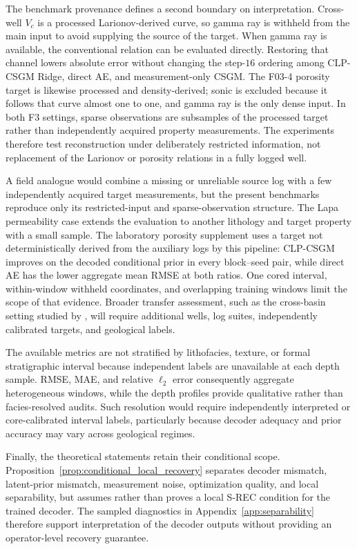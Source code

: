 The benchmark provenance defines a second boundary on interpretation.
Cross-well $V_c$ is a processed Larionov-derived curve, so gamma ray is
withheld from the main input to avoid supplying the source of the target.
When gamma ray is available, the conventional relation can be evaluated
directly. Restoring that channel lowers absolute error without changing the
step-$16$ ordering among CLP-CSGM Ridge, direct AE, and measurement-only CSGM.
The F03-4 porosity target is likewise processed and density-derived; sonic is
excluded because it follows that curve almost one to one, and gamma ray is
the only dense input. In both F3 settings, sparse observations are subsamples
of the processed target rather than independently acquired property
measurements. The experiments therefore test reconstruction under deliberately
restricted information, not replacement of the Larionov or porosity relations
in a fully logged well.

A field analogue would combine a missing or unreliable source log with a few
independently acquired target measurements, but the present benchmarks
reproduce only its restricted-input and sparse-observation structure. The
Lapa permeability case \citep{alvarez2025nonlinear} extends the evaluation to
another lithology and target property with a small sample. The laboratory
porosity supplement uses a target not deterministically derived from the
auxiliary logs by this pipeline: CLP-CSGM improves on the decoded conditional
prior in every block--seed pair, while direct AE has the lower aggregate mean
RMSE at both ratios. One cored interval, within-window withheld coordinates,
and overlapping training windows limit the scope of that evidence. Broader
transfer assessment, such as the cross-basin setting studied by
\citet{koeshidayatullah2026timegpt}, will require additional wells, log suites,
independently calibrated targets, and geological labels.

The available metrics are not stratified by lithofacies, texture, or formal
stratigraphic interval because independent labels are unavailable at each
depth sample. RMSE, MAE, and relative $\ell_2$ error consequently aggregate
heterogeneous windows, while the depth profiles provide qualitative rather
than facies-resolved audits. Such resolution would require independently
interpreted or core-calibrated interval labels, particularly because decoder
adequacy and prior accuracy may vary across geological regimes.

Finally, the theoretical statements retain their conditional scope.
Proposition~\ref{prop:conditional_local_recovery} separates decoder mismatch,
latent-prior mismatch, measurement noise, optimization quality, and local
separability, but assumes rather than proves a local S-REC condition for the
trained decoder. The sampled diagnostics in
Appendix~\ref{app:separability} therefore support interpretation of the
decoder outputs without providing an operator-level recovery guarantee.
